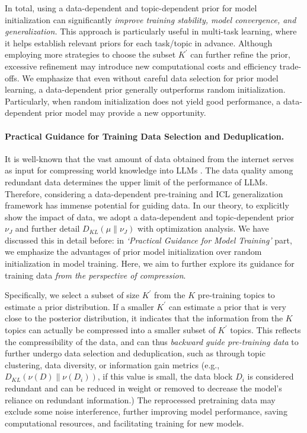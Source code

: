 In total, using a data-dependent and topic-dependent prior for model initialization can significantly \textit{improve training stability, model convergence, and generalization.} This approach is particularly useful in multi-task learning, where it helps establish relevant priors for each task/topic in advance. Although employing more strategies to choose the subset $K^\prime$ can further refine the prior, excessive refinement may introduce new computational costs and efficiency trade-offs. We emphasize that even without careful data selection for prior model learning, a data-dependent prior generally outperforms random initialization. Particularly, when random initialization does not yield good performance, a data-dependent prior model may provide a new opportunity.

\paragraph{Practical Guidance for Training Data Selection and Deduplication.} It is well-known that the vast amount of data obtained from the internet serves as input for compressing world knowledge into LLMs \citep{deletang2023language}. The data quality among redundant data determines the upper limit of the performance of LLMs. Therefore, considering a data-dependent pre-training and ICL generalization framework has immense potential for guiding data. In our theory, to explicitly show the impact of data, we adopt a data-dependent and topic-dependent prior $\nu_J$ and further detail $D_{KL}(\mu \parallel \nu_J)$ with optimization analysis. We have discussed this in detail before: in \textit{`Practical Guidance for Model Training'} part, we emphasize the advantages of prior model initialization over random initialization in model training. Here, we aim to further explore its guidance for training data \textit{from the perspective of compression}. 

Specifically, we select a subset of size $K^\prime$ from the $K$ pre-training topics to estimate a prior distribution. If a smaller $K^\prime$ can estimate a prior that is very close to the posterior distribution, it indicates that the information from the $K$ topics can actually be compressed into a smaller subset of $K^\prime$ topics. This reflects the compressibility of the data, and can thus \textit{backward guide pre-training data} to further undergo data selection and deduplication, such as through topic clustering, data diversity, or information gain metrics (e.g., $D_{KL}(\nu(D) \parallel \nu(D_i))$, if this value is small, the data block $D_i$ is considered redundant and can be reduced in weight or removed to decrease the model's reliance on redundant information.) The reprocessed pretraining data may exclude some noise interference, further improving model performance, saving computational resources, and facilitating training for new models.



